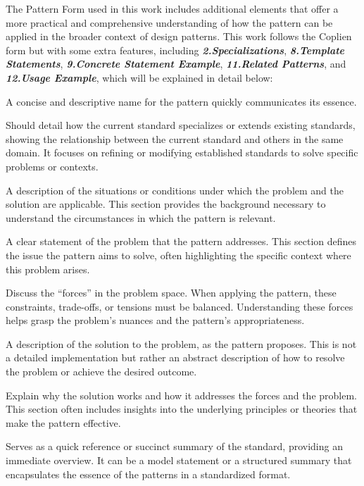 The Pattern Form used in this work includes additional elements that offer a more practical and comprehensive understanding of how the pattern can be applied in the broader context of design patterns. This work follows the Coplien form but with some extra features, including \textbf{\textit{2.Specializations}}, \textbf{\textit{8.Template Statements}}, \textbf{\textit{9.Concrete Statement Example}}, \textbf{\textit{11.Related Patterns}}, and \textbf{\textit{12.Usage Example}}, which will be explained in detail below:

 A concise and descriptive name for the pattern quickly communicates its essence.

 Should detail how the current standard specializes or extends existing standards, showing the relationship between the current standard and others in the same domain. It focuses on refining or modifying established standards to solve specific problems or contexts.

 A description of the situations or conditions under which the problem and the solution are applicable. This section provides the background necessary to understand the circumstances in which the pattern is relevant.

 A clear statement of the problem that the pattern addresses. This section defines the issue the pattern aims to solve, often highlighting the specific context where this problem arises.

 Discuss the ``forces'' in the problem space. When applying the pattern, these constraints, trade-offs, or tensions must be balanced. Understanding these forces helps grasp the problem's nuances and the pattern's appropriateness.

 A description of the solution to the problem, as the pattern proposes. This is not a detailed implementation but rather an abstract description of how to resolve the problem or achieve the desired outcome.

 Explain why the solution works and how it addresses the forces and the problem. This section often includes insights into the underlying principles or theories that make the pattern effective.

Serves as a quick reference or succinct summary of the standard, providing an immediate overview. It can be a model statement or a structured summary that encapsulates the essence of the patterns in a standardized format.

